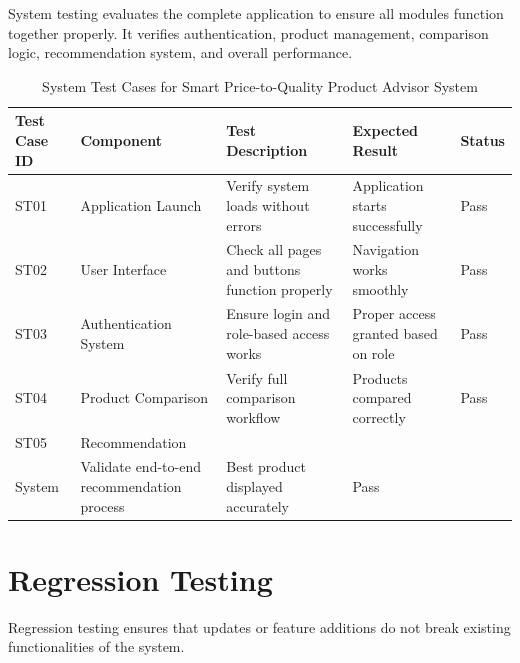 System testing evaluates the complete application to ensure all modules function together properly. It verifies authentication, product management, comparison logic, recommendation system, and overall performance.

\begin{table}[H]
    \centering
    \renewcommand{\arraystretch}{1.3}
    \begin{tabular}{|p{1.5cm}|p{3cm}|p{3.4cm}|p{3cm}|p{1.2cm}|}
        \hline
        \textbf{Test Case ID} & \textbf{Component} & \textbf{Test Description} & \textbf{Expected Result} & \textbf{Status} \\
        \hline
        ST01 & Application Launch & Verify system loads without errors & Application starts successfully & Pass \\
        \hline
        ST02 & User Interface & Check all pages and buttons function properly & Navigation works smoothly & Pass \\
        \hline
        ST03 & Authentication System & Ensure login and role-based access works & Proper access granted based on role & Pass \\
        \hline
        ST04 & Product Comparison & Verify full comparison workflow & Products compared correctly & Pass \\
        \hline
        ST05 & Recommendation\\ System & Validate end-to-end recommendation process & Best product displayed accurately & Pass \\
        \hline
    \end{tabular}
    \caption{System Test Cases for Smart Price-to-Quality Product Advisor System}
    \label{tab:system_tests}
\end{table}

\newpage
\section{Regression Testing}

Regression testing ensures that updates or feature additions do not break existing functionalities of the system.

